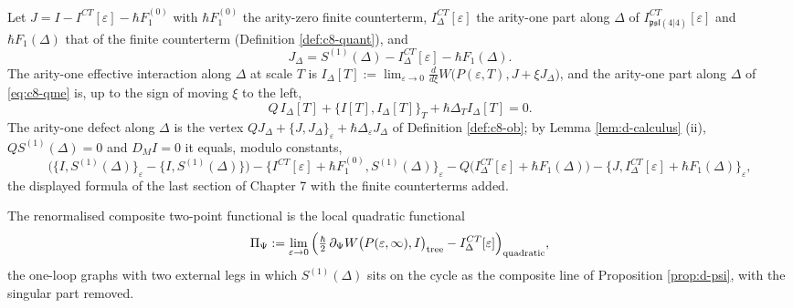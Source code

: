 \begin{definition}
\label{def:d-data}
Let $J=I-I^{CT}[\varepsilon]-\hbar F_1^{(0)}$ with $\hbar F_1^{(0)}$ the arity-zero finite counterterm, $I^{CT}_\Delta[\varepsilon]$ the arity-one part along $\Delta$ of $I^{CT}_{\mathfrak{psl}(4|4)}[\varepsilon]$ and $\hbar F_1(\Delta)$ that of the finite counterterm (Definition \ref{def:c8-quant}), and
\[
J_\Delta=S^{(1)}(\Delta)-I^{CT}_\Delta[\varepsilon]-\hbar F_1(\Delta).
\]
The arity-one effective interaction along $\Delta$ at scale $T$ is $I_\Delta[T]:=\lim_{\varepsilon\to0}\frac{d}{d\xi}W\big(P(\varepsilon,T),J+\xi J_\Delta\big)$, and the arity-one part along $\Delta$ of \eqref{eq:c8-qme} is, up to the sign of moving $\xi$ to the left,
\[
Q\,I_\Delta[T]+\big\{I[T],I_\Delta[T]\big\}_T+\hbar\Delta_TI_\Delta[T]=0 .
\]
The arity-one defect along $\Delta$ is the vertex $QJ_\Delta+\{J,J_\Delta\}_\varepsilon+\hbar\Delta_\varepsilon J_\Delta$ of Definition \ref{def:c8-ob}; by Lemma \ref{lem:d-calculus} (ii), $QS^{(1)}(\Delta)=0$ and $D_MI=0$ it equals, modulo constants,
\[
\big(\{I,S^{(1)}(\Delta)\}_\varepsilon-\{I,S^{(1)}(\Delta)\}\big)-\{I^{CT}[\varepsilon]+\hbar F_1^{(0)},S^{(1)}(\Delta)\}_\varepsilon-Q\big(I^{CT}_\Delta[\varepsilon]+\hbar F_1(\Delta)\big)-\{J,I^{CT}_\Delta[\varepsilon]+\hbar F_1(\Delta)\}_\varepsilon ,
\]
the displayed formula of the last section of Chapter 7 with the finite counterterms added.
\end{definition}

\begin{definition}
\label{def:d-PiPsi}
The renormalised composite two-point functional is the local quadratic functional
\[
\Pi_\Psi:=\lim_{\varepsilon\to0}\Big(\tfrac\hbar2\,\partial_\Psi W\big(P(\varepsilon,\infty),I\big)_{\rm tree}-I^{CT}_\Delta[\varepsilon]\Big)_{\rm quadratic},
\]
the one-loop graphs with two external legs in which $S^{(1)}(\Delta)$ sits on the cycle as the composite line of Proposition \ref{prop:d-psi}, with the singular part removed.
\end{definition}

